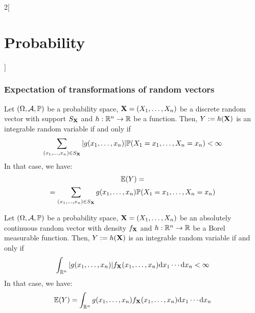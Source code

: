 \documentclass[../../../main.tex]{subfiles}
\begin{document}
\begin{multicols}{2}[\section{Probability}]
  \subsubsection{Expectation of transformations of random vectors}
  \begin{prop}
    Let $(\Omega,\mathcal{A},\mathbb{P})$ be a probability space, $\boldsymbol{\mathrm{X}}=(X_1,\ldots,X_n)$ be a discrete random vector with support $S_{\boldsymbol{\mathrm{X}}}$ and $h:\mathbb{R}^n\rightarrow\mathbb{R}$ be a function. Then, $Y:=h(\boldsymbol{\mathrm{X}})$ is an integrable random variable if and only if $$\sum_{(x_1,\ldots,x_n)\in S_{\boldsymbol{\mathrm{X}}}}|g(x_1,\ldots,x_n)|\mathbb{P}(X_1=x_1,\ldots,X_n=x_n)<\infty$$
    In that case, we have:
    \begin{multline*}
      \mathbb{E}(Y)=\\=\sum_{(x_1,\ldots,x_n)\in S_{\boldsymbol{\mathrm{X}}}}g(x_1,\ldots,x_n)\mathbb{P}(X_1=x_1,\ldots,X_n=x_n)
    \end{multline*}
  \end{prop}
  \begin{prop}
    Let $(\Omega,\mathcal{A},\mathbb{P})$ be a probability space, $\boldsymbol{\mathrm{X}}=(X_1,\ldots,X_n)$ be an absolutely continuous random vector with density $f_{\boldsymbol{\mathrm{X}}}$ and $h:\mathbb{R}^n\rightarrow\mathbb{R}$ be a Borel measurable function. Then, $Y:=h(\boldsymbol{\mathrm{X}})$ is an integrable random variable if and only if $$\int_{\mathbb{R}^n}|g(x_1,\ldots,x_n)|f_{\boldsymbol{\mathrm{X}}}(x_1,\ldots,x_n)\dd x_1\cdots\dd x_n<\infty$$
    In that case, we have:
    $$
      \mathbb{E}(Y)=\int_{\mathbb{R}^n}g(x_1,\ldots,x_n)f_{\boldsymbol{\mathrm{X}}}(x_1,\ldots,x_n)\dd x_1\cdots\dd x_n$$
  \end{prop}

\end{multicols}
\end{document}
